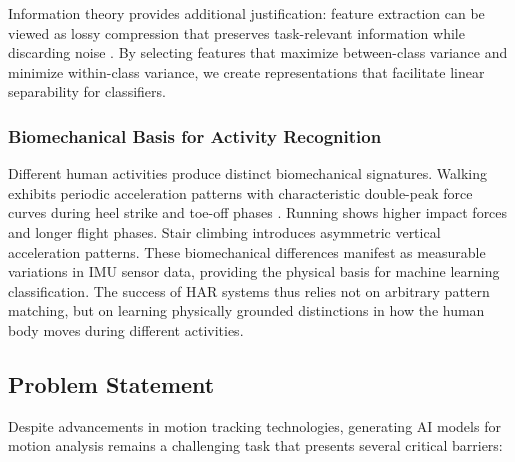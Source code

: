 Information theory provides additional justification: feature extraction can be viewed as lossy compression that preserves task-relevant information while discarding noise \cite{cover2006elements}. By selecting features that maximize between-class variance and minimize within-class variance, we create representations that facilitate linear separability for classifiers.

\subsubsection{Biomechanical Basis for Activity Recognition}

Different human activities produce distinct biomechanical signatures. Walking exhibits periodic acceleration patterns with characteristic double-peak force curves during heel strike and toe-off phases \cite{whittle2014gait}. Running shows higher impact forces and longer flight phases. Stair climbing introduces asymmetric vertical acceleration patterns. These biomechanical differences manifest as measurable variations in IMU sensor data, providing the physical basis for machine learning classification. The success of HAR systems thus relies not on arbitrary pattern matching, but on learning physically grounded distinctions in how the human body moves during different activities.

\subsection{Problem Statement}

Despite advancements in motion tracking technologies, generating AI models for motion analysis remains a challenging task that presents several critical barriers:

